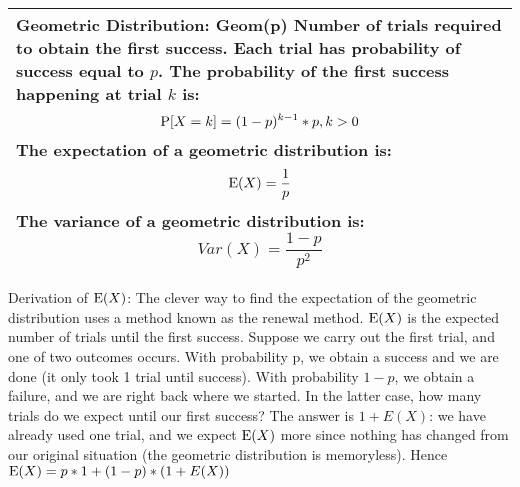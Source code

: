 {\tabulinesep=1mm
\begin{tabu}{|p{16cm} |}
\hline
\vspace{1 mm}
\textbf{Geometric Distribution: Geom(p)}
Number of trials required to obtain the first success. Each trial has 
probability of success equal to $p$. The probability of the first success 
happening at trial $k$ is:
\[ \P[X = k] = (1 - p)^{k - 1}*p, k > 0\]
The expectation of a geometric distribution is:
\[\E(X) = \frac{1}{p}\]
The variance of a geometric distribution is:
\[Var(X) = \frac{1 -p}{p^2}\]
\vspace{1 mm}
\\
\hline
\end{tabu}
}

\begin{solution} %
Derivation of $\E(X)$:
The clever way to find the expectation of the geometric distribution 
uses a method known as the renewal method. $\E(X)$ is the expected number 
of trials until the first success. Suppose we carry out the first trial,
and one of two outcomes occurs. With probability p, we obtain a success 
and we are done (it only took 1 trial until success). With probability 
$1 - p$, we obtain a failure, and we are right back where we started. 
In the latter case, how many trials do we expect until our first success? 
The answer is $1 + E(X)$: we have already used one trial, and we expect 
$\E(X)$ more since nothing has changed from our original situation 
(the geometric distribution is memoryless). Hence 
$\E(X) = p * 1 + (1 - p) * (1 + E(X))$
\end{solution}